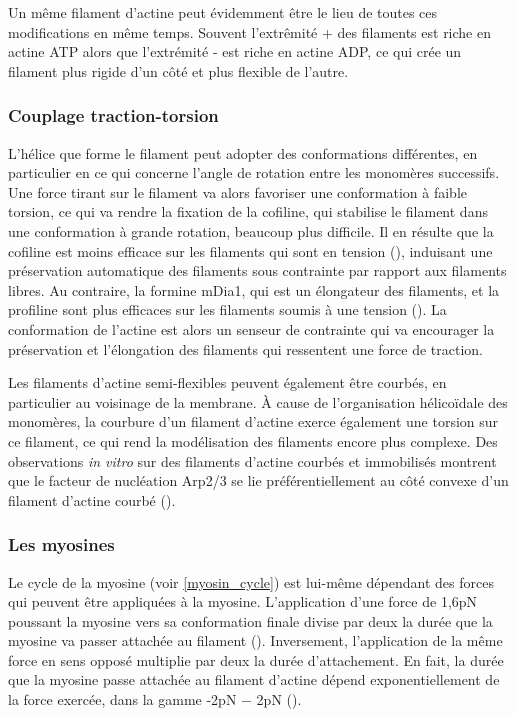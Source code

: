 Un même filament d'actine peut évidemment être le lieu de toutes ces modifications en même temps. Souvent l'extrêmité + des filaments est riche en actine ATP alors que l'extrémité - est riche en actine ADP, ce qui crée un filament plus rigide d'un côté et plus flexible de l'autre. 

\subsubsection{Couplage traction-torsion}

L'hélice que forme le filament peut adopter des conformations différentes, en particulier en ce qui concerne l'angle de rotation entre les monomères successifs. 
Une force tirant sur le filament va alors favoriser une conformation à faible torsion, ce qui va rendre la fixation de la cofiline, qui stabilise le filament dans une conformation à grande rotation, beaucoup plus difficile. 
Il en résulte que la cofiline est moins efficace sur les filaments qui sont en tension (\cite{hayakawa_actin_2011}), induisant une préservation automatique des filaments sous contrainte par rapport aux filaments libres. 
Au contraire, la formine mDia1, qui est un élongateur des filaments, et la profiline sont plus efficaces sur les filaments soumis à une tension (\cite{higashida_f-_2013}). 
La conformation de l'actine est alors un senseur de contrainte qui va encourager la préservation et l'élongation des filaments qui ressentent une force de traction. 

Les filaments d'actine semi-flexibles peuvent également être courbés, en particulier au voisinage de la membrane. 
À cause de l'organisation hélicoïdale des monomères, la courbure d'un filament d'actine exerce également une torsion sur ce filament, ce qui rend la modélisation des filaments encore plus complexe. 
Des observations \textit{in vitro} sur des filaments d'actine courbés et immobilisés montrent que le facteur de nucléation Arp2/3 se lie préférentiellement au côté convexe d'un filament d'actine courbé (\cite{risca_actin_2012}). 

\subsubsection{Les myosines}

Le cycle de la myosine (voir \ref{myosin_cycle}) est lui-même dépendant des forces qui peuvent être appliquées à la myosine. 
L'application d'une force de 1,6pN poussant la myosine vers sa conformation finale divise par deux la durée que la myosine va passer attachée au filament 
(\cite{veigel_load-dependent_2003}). 
Inversement, l'application de la même force en sens opposé multiplie par deux la durée d'attachement. 
En fait, la durée que la myosine passe attachée au filament d'actine dépend exponentiellement de la force exercée, dans la gamme -2pN $-$ 2pN (\cite{veigel_load-dependent_2003}). 

